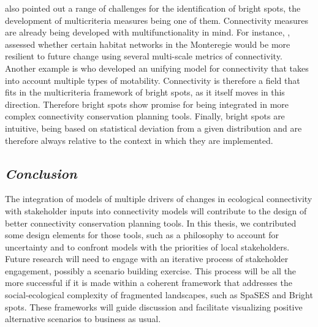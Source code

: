\documentclass[12pt,Bold,TexShade]{thesis/mcgilletdclass}
\begin{document}
{\citeauthor{frei_bright_2018} also pointed out a range of challenges for the identification of bright spots, the development of multicriteria measures being one of them. Connectivity measures are already being developed with  multifunctionality in mind. For instance, \cite{rayfield_priorisation_2018}, assessed whether certain habitat networks in the Monteregie would be more resilient to future change using several multi-scale metrics of connectivity. Another example is \cite{fletcher_towards_2019} who developed an unifying model for connectivity that takes into account multiple types of motability. Connectivity is therefore a field that fits in the multicriteria framework of bright spots, as it itself moves in this direction.  Therefore bright spots show promise for being integrated in more complex connectivity conservation planning tools. Finally, bright spots are intuitive, being based on statistical deviation from a given distribution and are therefore always relative to the context in which they are implemented. \\

\vspace{3em}

\subsection*{\textit{Conclusion \\ \vspace{2em}}}

The integration of models of multiple drivers of changes in ecological connectivity with stakeholder inputs into connectivity models will contribute to the design of better connectivity conservation planning tools. In this thesis, we contributed some design elements for those tools, such as a philosophy to account for uncertainty and to confront models with the priorities of local stakeholders. Future research will need to engage with an iterative process of stakeholder engagement, possibly a scenario building exercise. This process will be all the more successful if it is made within a coherent framework that addresses the social-ecological complexity of fragmented landscapes, such as SpaSES and Bright spots. These frameworks will guide discussion and facilitate visualizing positive alternative scenarios to business as usual.
}%
\Disc%

%



\printbibliography[heading=bibintoc, section=0, title={General Bibliography \vspace{1em}}]
\end{document}
